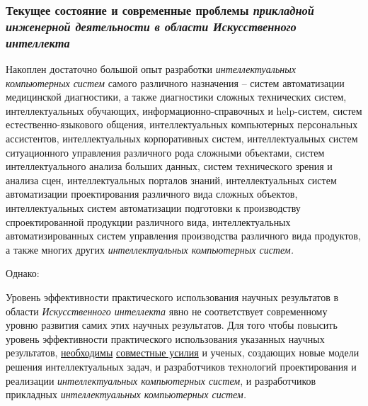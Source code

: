 \subsubsection{Текущее состояние и современные проблемы \textbf{\textit{прикладной}} \textbf{\textit{инженерной деятельности в области Искусственного интеллекта}}}

Накоплен достаточно большой опыт разработки \textit{интеллектуальных компьютерных систем} самого различного назначения -- систем автоматизации медицинской диагностики, а также диагностики сложных технических систем, интеллектуальных обучающих, информационно-справочных и help-систем, систем естественно-языкового общения, интеллектуальных компьютерных персональных ассистентов, интеллектуальных корпоративных систем, интеллектуальных систем ситуационного управления различного рода сложными объектами, систем интеллектуального анализа больших данных, систем технического зрения и анализа сцен, интеллектуальных порталов знаний, интеллектуальных систем автоматизации проектирования различного вида сложных объектов, интеллектуальных систем автоматизации подготовки к производству спроектированной продукции различного вида, интеллектуальных автоматизированных систем управления производства различного вида продуктов, а также многих других \textit{интеллектуальных компьютерных систем.}

Однако:

\begin{textitemize}
	\item
	Уровень эффективности практического использования научных результатов в области \textit{Искусственного интеллекта} явно не соответствует современному уровню развития самих этих научных результатов. Для того чтобы повысить уровень эффективности практического использования указанных научных результатов, \underline{необходимы} \underline{совместные усилия} и ученых, создающих новые модели решения интеллектуальных задач, и разработчиков технологий проектирования и реализации \textit{интеллектуальных компьютерных систем}, и разработчиков прикладных \textit{интеллектуальных компьютерных систем.}
\end{textitemize}

